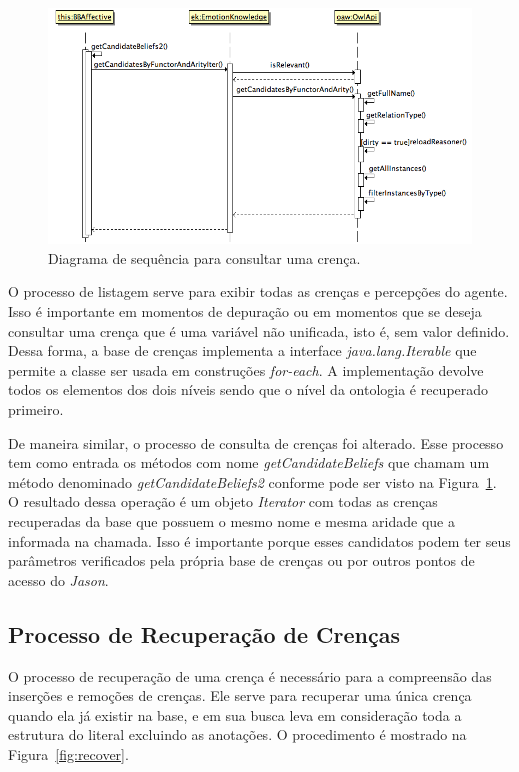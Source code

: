 \begin{figure}
  \centering
  \includegraphics[width=12cm]{figuras/sd-getCB.png}
  \caption{Diagrama de sequência para consultar uma crença.}
  \label{fig:getCandidates}
\end{figure}

O processo de listagem serve para exibir todas as crenças e percepções do
agente. Isso é importante em momentos de depuração ou em momentos que se
deseja consultar uma crença que é uma variável não unificada, isto é, sem
valor definido. Dessa forma, a base de crenças implementa a interface
\emph{java.lang.Iterable} que permite a classe ser usada em construções
\emph{for-each}. A implementação devolve todos os elementos dos dois níveis
sendo que o nível da ontologia é recuperado primeiro.

De maneira similar, o processo de consulta de crenças foi alterado.
Esse processo tem como entrada os métodos com nome \emph{getCandidateBeliefs}
que chamam um método denominado \emph{getCandidateBeliefs2} conforme
pode ser visto na Figura~\ref{fig:getCandidates}. O resultado dessa operação é
um objeto \emph{Iterator} com todas as crenças recuperadas da base que possuem
o mesmo nome e mesma aridade que a informada na chamada. Isso é importante
porque esses candidatos podem ter seus parâmetros verificados pela própria
base de crenças ou por outros pontos de acesso do \emph{Jason}.

\subsection{Processo de Recuperação de Crenças}

O processo de recuperação de uma crença é necessário para a compreensão das
inserções e remoções de crenças. Ele serve para recuperar uma única crença
quando ela já existir na base, e em sua busca leva em consideração toda a
estrutura do literal excluindo as anotações. O procedimento é mostrado na
Figura~\ref{fig:recover}.

